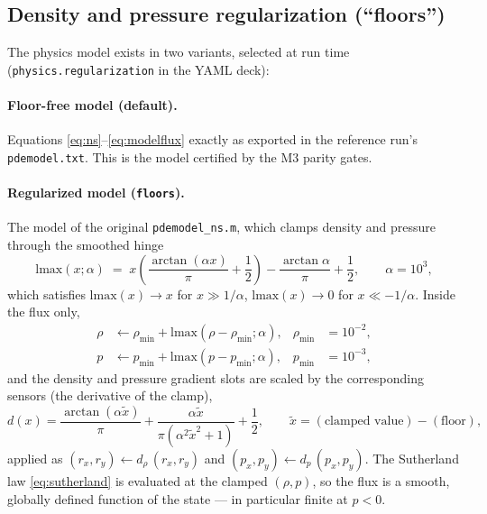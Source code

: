 \documentclass[11pt]{article}
\newcommand{\code}[1]{\texttt{#1}}
\begin{document}
\subsection{Density and pressure regularization (``floors'')}
\label{sec:floors}

The physics model exists in two variants, selected at run time
(\code{physics.regularization} in the YAML deck):

\paragraph{Floor-free model (default).} Equations
\eqref{eq:ns}--\eqref{eq:modelflux} exactly as exported in the reference
run's \code{pdemodel.txt}. This is the model certified by the M3 parity
gates.

\paragraph{Regularized model (\code{floors}).} The model of the original
\code{pdemodel\_ns.m}, which clamps density and pressure through the smoothed
hinge
\begin{equation}
\mathrm{lmax}(x;\alpha) \;=\;
x\left(\frac{\arctan(\alpha x)}{\pi} + \frac12\right)
- \frac{\arctan\alpha}{\pi} + \frac12,
\qquad \alpha = 10^{3},
\end{equation}
which satisfies $\mathrm{lmax}(x)\to x$ for $x\gg 1/\alpha$,
$\mathrm{lmax}(x)\to 0$ for $x\ll -1/\alpha$. Inside the flux only,
\begin{align}
\rho &\leftarrow \rho_{\min} + \mathrm{lmax}(\rho - \rho_{\min};\alpha),
& \rho_{\min} &= 10^{-2},\\
p &\leftarrow p_{\min} + \mathrm{lmax}(p - p_{\min};\alpha),
& p_{\min} &= 10^{-3},
\end{align}
and the density and pressure gradient slots are scaled by the corresponding
sensors (the derivative of the clamp),
\begin{equation}
d(x) = \frac{\arctan(\alpha \tilde x)}{\pi}
+ \frac{\alpha \tilde x}{\pi(\alpha^2 \tilde x^2 + 1)} + \frac12,
\qquad \tilde x = (\text{clamped value}) - (\text{floor}),
\end{equation}
applied as $(r_x, r_y) \leftarrow d_\rho\,(r_x, r_y)$ and
$(p_x, p_y) \leftarrow d_p\,(p_x, p_y)$. The Sutherland law
\eqref{eq:sutherland} is evaluated at the clamped $(\rho, p)$, so the flux is
a smooth, globally defined function of the state --- in particular finite at
$p<0$.
\end{document}
